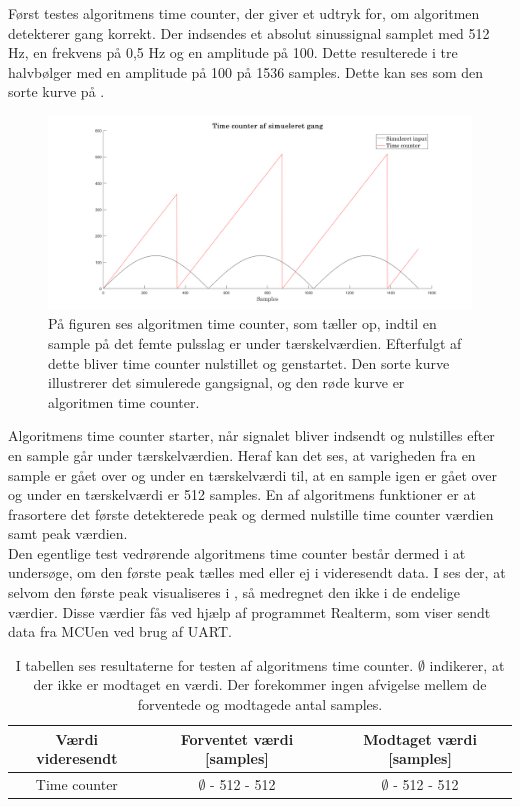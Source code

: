 Først testes algoritmens time counter, der giver et udtryk for, om algoritmen detekterer gang korrekt. Der indsendes et absolut sinussignal samplet med 512 Hz, en frekvens på 0,5 Hz og en amplitude på 100. Dette resulterede i tre halvbølger med en amplitude på 100 på 1536 samples. Dette kan ses som den sorte kurve på .
\begin{figure}[H]
	\centering
	\includegraphics[width=.9\textwidth]{figures/cDesign/test_timecount_gang.png}
	\caption{På figuren ses algoritmen time counter, som tæller op, indtil en sample på det femte pulsslag er under tærskelværdien. Efterfulgt af dette bliver time counter nulstillet og genstartet. Den sorte kurve illustrerer det simulerede gangsignal, og den røde kurve er algoritmen time counter.}
	\label{fig:testgraf_timecounter}
\end{figure}\vspace{-0.25cm}
Algoritmens time counter starter, når signalet bliver indsendt og nulstilles efter en sample går under tærskelværdien. Heraf kan det ses, at varigheden fra en sample er gået over og under en tærskelværdi til, at en sample igen er gået over og under en tærskelværdi er 512 samples. En af algoritmens funktioner er at frasortere det første detekterede peak og dermed nulstille time counter værdien samt peak værdien.\\
Den egentlige test vedrørende algoritmens time counter består dermed i at undersøge, om den første peak tælles med eller ej i videresendt data. I  ses der, at selvom den første peak visualiseres i , så medregnet den ikke i de endelige værdier. Disse værdier fås ved hjælp af programmet Realterm, som viser sendt data fra MCUen ved brug af UART.
\begin{table}[H]
	\centering
	\begin{tabular}{ccc}
		\hline
		\rowcolor[HTML]{C0C0C0} 
		Værdi videresendt & Forventet værdi [samples] & Modtaget værdi [samples] \\ \hline
		Time counter & $\emptyset$ - 512 - 512 & $\emptyset$ - 512 - 512 \\ \hline
	\end{tabular}
	\caption{I tabellen ses resultaterne for testen af algoritmens time counter. $\emptyset$ indikerer, at der ikke er modtaget en værdi. Der forekommer ingen afvigelse mellem de forventede og modtagede antal samples.}
	\label{tab:test_res_timecount}
\end{table}\vspace{-0.25cm}
